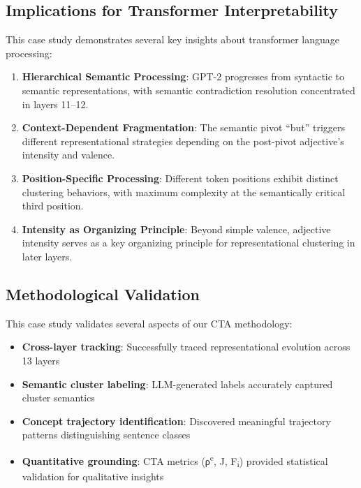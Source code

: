 \subsection{Implications for Transformer Interpretability}

This case study demonstrates several key insights about transformer language processing:

\begin{enumerate}
    \item \textbf{Hierarchical Semantic Processing}: GPT-2 progresses from syntactic to semantic representations, with semantic contradiction resolution concentrated in layers 11--12.
    
    \item \textbf{Context-Dependent Fragmentation}: The semantic pivot ``but'' triggers different representational strategies depending on the post-pivot adjective's intensity and valence.
    
    \item \textbf{Position-Specific Processing}: Different token positions exhibit distinct clustering behaviors, with maximum complexity at the semantically critical third position.
    
    \item \textbf{Intensity as Organizing Principle}: Beyond simple valence, adjective intensity serves as a key organizing principle for representational clustering in later layers.
\end{enumerate}

\subsection{Methodological Validation}

This case study validates several aspects of our CTA methodology:

\begin{itemize}
    \item \textbf{Cross-layer tracking}: Successfully traced representational evolution across 13 layers
    \item \textbf{Semantic cluster labeling}: LLM-generated labels accurately captured cluster semantics
    \item \textbf{Concept trajectory identification}: Discovered meaningful trajectory patterns distinguishing sentence classes
    \item \textbf{Quantitative grounding}: CTA metrics (ρ\textsuperscript{c}, J, F\textsubscript{i}) provided statistical validation for qualitative insights
\end{itemize}


